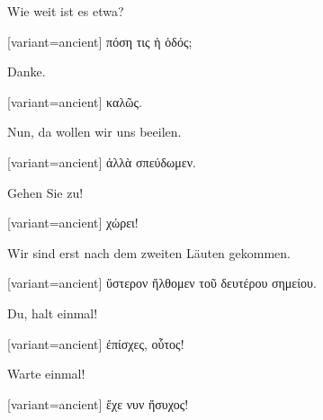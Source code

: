 Wie weit ist es etwa?

\switchcolumn

\begin{greek}[variant=ancient]%
πόση τις ἡ ὁδός;

\end{greek}%
\switchcolumn*

Danke.

\switchcolumn

\begin{greek}[variant=ancient]%
καλῶς.

\end{greek}%
\switchcolumn*

Nun, da wollen wir uns beeilen.

\switchcolumn

\begin{greek}[variant=ancient]%
ἀλλὰ σπεύδωμεν.

\end{greek}%
\switchcolumn*

Gehen Sie zu!

\switchcolumn

\begin{greek}[variant=ancient]%
χώρει!

\end{greek}%
\switchcolumn*

Wir sind erst nach dem zweiten Läuten gekommen.

\switchcolumn

\begin{greek}[variant=ancient]%
ὕστερον ἤλθομεν τοῦ δευτέρου σημείου.

\end{greek}%
\indent Du, halt einmal!

\switchcolumn

\begin{greek}[variant=ancient]%
ἐπίσχες, οὗτος!

\end{greek}%
\switchcolumn*

Warte einmal!

\switchcolumn

\begin{greek}[variant=ancient]%
ἔχε νυν ἥσυχος!

\end{greek}%
\switchcolumn*


